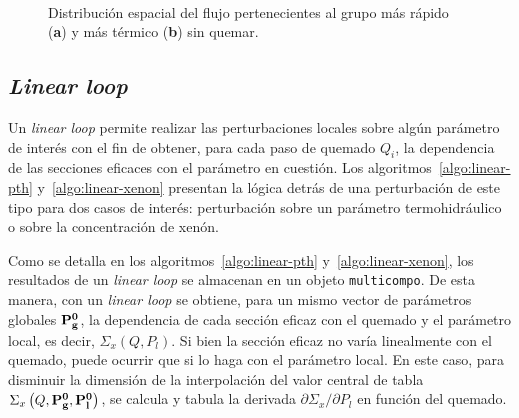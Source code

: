 \documentclass[11pt]{article}
\renewcommand{\vec}[1]{\ensuremath\mathbf{#1}}
\begin{document}
\begin{figure}[!h]
 \begin{center}
  \newline
  \\
  \caption{Distribución espacial del flujo pertenecientes al grupo más rápido (\textbf{a}) y más térmico (\textbf{b}) sin quemar.}
  \label{fig:fluxes}
 \end{center}
\end{figure}


\subsection{\emph{Linear loop}} \label{subsec:linear-loop}

Un \emph{linear loop} permite realizar las perturbaciones locales sobre algún parámetro de interés con el fin de obtener, para cada paso de quemado $Q_i$, la dependencia de las secciones eficaces con el parámetro en cuestión. Los algoritmos~\ref{algo:linear-pth} y~\ref{algo:linear-xenon} presentan la lógica detrás de una perturbación de este tipo para dos casos de interés: perturbación sobre un parámetro termohidráulico o sobre la concentración de xenón.

Como se detalla en los algoritmos~\ref{algo:linear-pth} y~\ref{algo:linear-xenon}, los resultados de un \emph{linear loop} se almacenan en un objeto \texttt{multicompo}. De esta manera, con un \emph{linear loop} se obtiene, para un mismo vector de parámetros globales $\vec{P^0_g}$, la dependencia de cada sección eficaz con el quemado y el parámetro local, es decir, $\Sigma_x \left( Q, P_l \right)$. Si bien la sección eficaz no varía linealmente con el quemado, puede ocurrir que si lo haga con el parámetro local. En este caso, para disminuir la dimensión de la interpolación del valor central de tabla $\Sigma_x \left( Q, \vec{P^0_g}, \vec{P^0_l} \right)$, se calcula y tabula la derivada $\partial\Sigma_x / \partial P_l$ en función del quemado.
\end{document}
